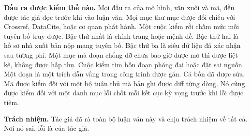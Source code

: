 \noindent\textbf{Đầu ra được kiểm thế nào.} Mọi đầu ra của mô hình, văn xuôi và mã, đều được tác
giả đọc trước khi vào luận văn. Mọi mục thư mục được đối chiếu với Crossref, DataCite, hoặc cơ
quan phát hành. Một cuộc kiểm rồi chấm mức mỗi tuyên bố truy được. Bậc thứ nhất là chính trang
hoặc mệnh đề. Bậc thứ hai là hồ sơ nhà xuất bản nộp mang tuyên bố. Bậc thứ ba là siêu dữ liệu đã
xác nhận sau tường phí. Một mục mà đoạn chống đỡ chưa bao giờ được mở thì được liệt kê, không
được hấp thụ. Cuộc kiểm tìm bốn đoạn phóng đại hoặc đặt sai nguồn. Một đoạn là một trích dẫn vắng
trong công trình được gán. Cả bốn đã được sửa. Mã được kiểm đối với một bộ tuân thủ mà bản ghi
được diff từng dòng. Nó cũng được kiểm đối với một danh mục lỗi chốt mỗi kết cục kỳ vọng trước
khi lỗi được tiêm.

\noindent\textbf{Trách nhiệm.} Tác giả đã rà toàn bộ luận văn này và chịu trách nhiệm về tất cả.
Nơi nó sai, lỗi là của tác giả.
